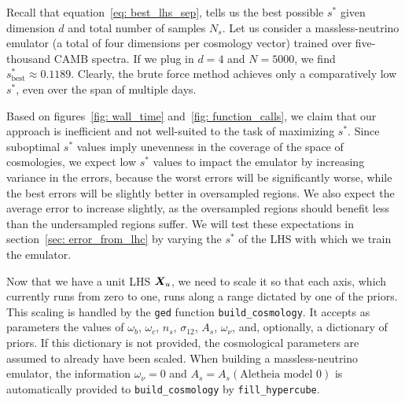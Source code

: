 Recall that equation~\ref{eq: best_lhs_sep}, tells us the best possible $s^*$
given dimension $d$ and total number of samples $N_s$. Let us consider a 
massless-neutrino emulator (a total of four dimensions per cosmology vector)
trained over five-thousand CAMB spectra. If we plug in $d = 4$ and $N=5000$,
we find $s^*_\text{best} \approx 0.1189$. Clearly, the brute force method
achieves only a comparatively low $s^*$, even over the span of multiple days.

Based on figures~\ref{fig: wall_time} and~\ref{fig: function_calls}, we
claim that our approach is inefficient and not well-suited to the task of 
maximizing $s^*$. Since suboptimal $s^*$ values imply unevenness in the
coverage of the space of cosmologies, we expect low $s^*$ values to impact
the emulator by increasing variance in the errors, because the worst errors
will be significantly worse, while the best errors will be slightly better in
oversampled regions. We also expect the average error to increase slightly,
as the oversampled regions should benefit less than the undersampled regions
suffer. We will test these expectations in section~\ref{sec: error_from_lhc} 
by varying the $s^*$ of the LHS with which we train the emulator.


Now that we have a unit LHS $\bm{X}_u$, we need to scale it 
so that each axis, which currently runs from zero to one, runs along a range 
dictated by one of the priors. This scaling is handled by the \texttt{ged}
function \verb|build_cosmology|. It accepts as parameters the values of
$\omega_b$, $\omega_c$, $n_s$, $\sigma_{12}$, $A_s$, $\omega_\nu$, and, 
optionally, a dictionary of priors. If this
dictionary is not provided, the cosmological parameters are assumed to
already have been scaled. When building a massless-neutrino emulator,
the information $\omega_\nu = 0$ and $A_s = A_s(\text{Aletheia model 0})$ is
automatically provided to \verb|build_cosmology| by
\verb|fill_hypercube|. 

